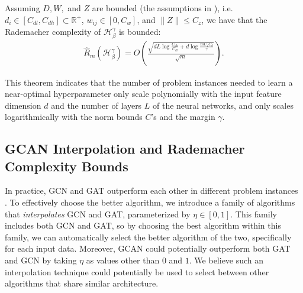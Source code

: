 \begin{theorem}\label{thm:rc of SGC}
    Assuming $D, W,$ and $Z$ are bounded (the assumptions in \cite{bartlett2017spectrally,garg2020generaliz}), i.e. $d_i \in [C_{dl}, C_{dh}] \subset \mathbb{R}^+$, $w_{ij}\in [0,C_w]$, and $\|Z\|\leq C_z$, we have that the 
    Rademacher complexity of $\mathcal{H}^{\gamma}_{\beta}$ is bounded:
    \begin{align*}
    \hat R_{m}(\mathcal{H}^{\gamma}_{\beta})
    = O\left( \frac{\sqrt{dL\log\frac{C_{dh}}{C_{dl}} + d\log{\frac{mC_zC_\theta}{\gamma}}}}{\sqrt{m}}\right).
    \end{align*}
\end{theorem}
\noindent This theorem indicates that the number of problem instances needed to learn a near-optimal hyperparameter only scale polynomially with the input feature dimension $d$ and the number of layers $L$ of the neural networks, and only scales logarithmically with the norm bounds $C$'s and the margin $\gamma$. 

\subsection{GCAN Interpolation and  Rademacher Complexity Bounds} \label{sec:interpolated GCAN}
In practice, GCN and GAT outperform each other in different problem instances \citep{dwivedi2023benchmarking}. To effectively choose the better algorithm, we introduce a family of algorithms that \emph{interpolates} GCN and GAT, parameterized by $\eta \in [0,1]$. 
This family includes both GCN and GAT, so by choosing the best algorithm within this family, we can automatically select the better algorithm of the two, specifically for each input data. 
Moreover, GCAN could potentially outperform both GAT and GCN by taking $\eta$ as values other than $0$ and $1$.
We believe such an interpolation technique could potentially be used to select between other algorithms that share similar architecture. 
%

